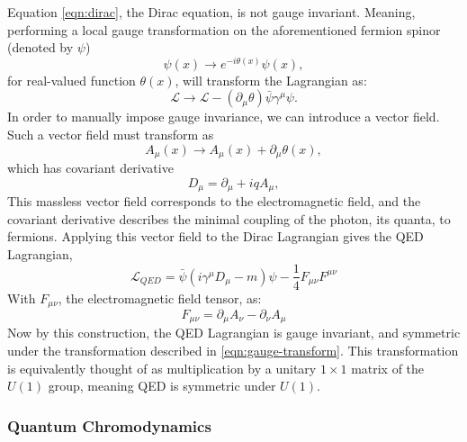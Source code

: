         Equation \ref{eqn:dirac}, the Dirac equation, is not gauge invariant. Meaning, performing a local gauge transformation on the aforementioned fermion spinor (denoted by $\psi$)
        \begin{equation} \label{eqn:gauge-transform}
            \psi(x) \rightarrow e^{-i\theta(x)}\psi(x),
        \end{equation}        
        for real-valued function $\theta(x)$, will transform the Lagrangian as:
        \begin{equation}
            \mathcal{L} \rightarrow \mathcal{L} - (\partial_{\mu}\theta)\bar{\psi}\gamma^{\mu}\psi.
        \end{equation}
        In order to manually impose gauge invariance, we can introduce a vector field. Such a vector field must transform as
        \begin{equation}
            A_{\mu}(x) \rightarrow A_{\mu}(x) + \partial_{\mu}\theta(x),
        \end{equation}
        which has covariant derivative
        \begin{equation}
            D_{\mu} = \partial_{\mu} + iqA_{\mu},
        \end{equation}
        This massless vector field corresponds to the electromagnetic field, and the covariant derivative describes the minimal coupling of the photon, its quanta, to fermions. Applying this vector field to the Dirac Lagrangian gives the \gls{QED} Lagrangian,
        \begin{equation}
            \mathcal{L}_{QED} = \bar{\psi} (i \gamma^{\mu} D_{\mu} - m)\psi - \frac{1}{4} F_{\mu \nu}F^{\mu \nu}
        \end{equation}
        With $F_{\mu \nu}$, the electromagnetic field tensor, as:
        \begin{equation}
        F_{\mu \nu} = \partial_{\mu}A_{\nu} - \partial_{\nu}A_{\mu}
        \end{equation}
        Now by this construction, the \gls{QED} Lagrangian is gauge invariant, and symmetric under the transformation described in \ref{eqn:gauge-transform}. This transformation is equivalently thought of as multiplication by a unitary $1 \times 1$ matrix of the $U(1)$ group, meaning \gls{QED} is symmetric under $U(1)$.


        \subsubsection{Quantum Chromodynamics} \label{sssec:QCD}

